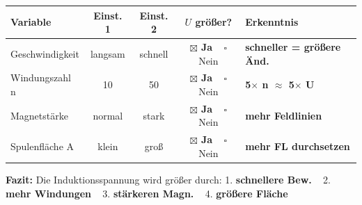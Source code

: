 \documentclass[11pt,a4paper]{article}
\newcommand{\lsg}[1]{\textcolor{loesung}{\textbf{#1}}}
\begin{document}
\vspace{0.3em}

\begin{protokollbox}[title=Kasten 2: Einflussfaktoren -- Was erhöht die Spannung?]
\small
\renewcommand{\arraystretch}{1.2}
\begin{tabular}{|p{3.2cm}|c|c|c|p{4cm}|}
\hline
\textbf{Variable} & \textbf{Einst. 1} & \textbf{Einst. 2} & \textbf{$U$ größer?} & \textbf{Erkenntnis} \\
\hline
Geschwindigkeit & langsam & schnell & \lsg{$\boxtimes$ Ja} ~ $\square$ Nein & \lsg{schneller = größere Änd.} \\[0.1cm]
\hline
Windungszahl n & 10 & 50 & \lsg{$\boxtimes$ Ja} ~ $\square$ Nein & \lsg{5$\times$ n $\approx$ 5$\times$ U} \\[0.1cm]
\hline
Magnetstärke & normal & stark & \lsg{$\boxtimes$ Ja} ~ $\square$ Nein & \lsg{mehr Feldlinien} \\[0.1cm]
\hline
Spulenfläche A & klein & groß & \lsg{$\boxtimes$ Ja} ~ $\square$ Nein & \lsg{mehr FL durchsetzen} \\[0.1cm]
\hline
\end{tabular}

\vspace{0.2em}
\textbf{Fazit:} Die Induktionsspannung wird größer durch:
1. \lsg{schnellere Bew.} ~ 2. \lsg{mehr Windungen} ~ 3. \lsg{stärkeren Magn.} ~ 4. \lsg{größere Fläche}
\end{protokollbox}

\vspace{0.3em}
\end{document}
